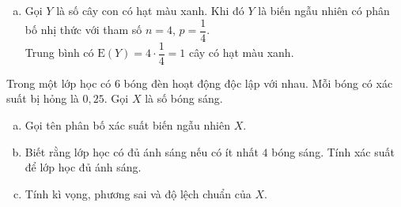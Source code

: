 \begin{bt}
{\begin{enumerate}[a)]
\begin{center}
\begin{tabular}{|c|c|c|c|c|c|}
					\hline
					$X$ & $0$ & $1$ & $2$ & $3$ & $4$ \\
					\hline
					$\mathrm{P}$ & $\dfrac{1}{256}$ & $\dfrac{12}{256}$ & $\dfrac{54}{256}$ & $\dfrac{108}{256}$ & $\dfrac{81}{256}$ \\
					\hline
				\end{tabular}
			\end{center}
			\item Gọi $Y$ là số cây con có hạt màu xanh. Khi đó $Y$ là biến ngẫu nhiên có phân bố nhị thức với tham số $n=4$, $p=\dfrac{1}{4}$.\\
			Trung bình có $\mathrm{E}(Y)=4\cdot\dfrac{1}{4}=1$ cây có hạt màu xanh.
		\end{enumerate}
	}
\end{bt}

\begin{bt}%

	Trong một lớp học có $6$ bóng đèn hoạt động độc lập với nhau. Mỗi bóng có xác suất bị hỏng là $0{,}25$. Gọi $X$ là số bóng sáng.
	\begin{enumerate}[a)]
		\item Gọi tên phân bố xác suất biến ngẫu nhiên $X$.
		\item Biết rằng lớp học có đủ ánh sáng nếu có ít nhất $4$ bóng sáng. Tính xác suất để lớp học đủ ánh sáng.
		\item Tính kì vọng, phương sai và độ lệch chuẩn của $X$.
	\end{enumerate}
	
\end{bt}

